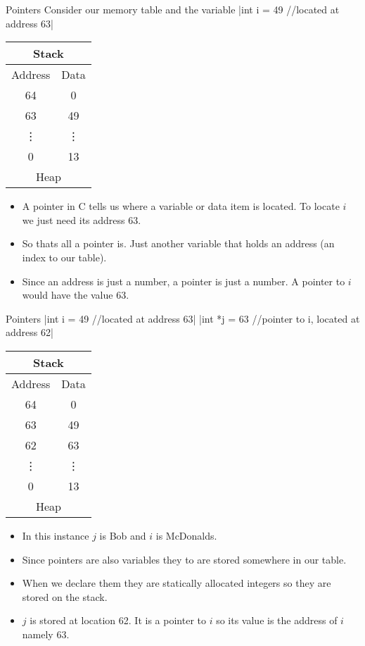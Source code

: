 \documentclass[10pt]{beamer}
\begin{document}
\begin{frame}[fragile]{Pointers}
	Consider our memory table and the variable
	|int i = 49 //located at address 63|

	\begin{tabular}{|c|c|}
		\hline
		\multicolumn{2}{|c|}{Stack}\\
		\hline
		Address & Data\\
		\hline
		64 &	0\\
		\hline
		63 &	49\\
		\hline
		\vdots & \vdots \\
		\hline
		0 & 13\\
		\hline
		\multicolumn{2}{|c|}{Heap}\\
		\hline
	\end{tabular}


	\begin{itemize}[<+->]
		\item A pointer in C tells us where a variable or data item is located. To locate $i$ we just need its address 63.
		\item So thats all a pointer is. Just another variable that holds an address (an index to our table).
		\item Since an address is just a number, a pointer is just a number. A pointer to $i$ would have the value 63.
	\end{itemize}
\end{frame}

\begin{frame}[fragile]{Pointers}
	|int i = 49 //located at address 63|
	|int *j = 63 //pointer to i, located at address 62|

	\begin{tabular}{|c|c|}
		\hline
		\multicolumn{2}{|c|}{Stack}\\
		\hline
		Address & Data\\
		\hline
		64 &	0\\
		\hline
		63 &	49\\
		\hline
		62 &	63\\
		\hline
		\vdots & \vdots \\
		\hline
		0 & 13\\
		\hline
		\multicolumn{2}{|c|}{Heap}\\
		\hline
	\end{tabular}


	\begin{itemize}[<+->]
		\item In this instance $j$ is Bob and $i$ is McDonalds.
		\item Since pointers are also variables they to are stored somewhere in our table.
		\item When we declare them they are statically allocated integers so they are stored on the stack.
		\item $j$ is stored at location 62. It is a pointer to $i$ so its value is the address of $i$ namely 63.
	\end{itemize}
\end{frame}
\end{document}
